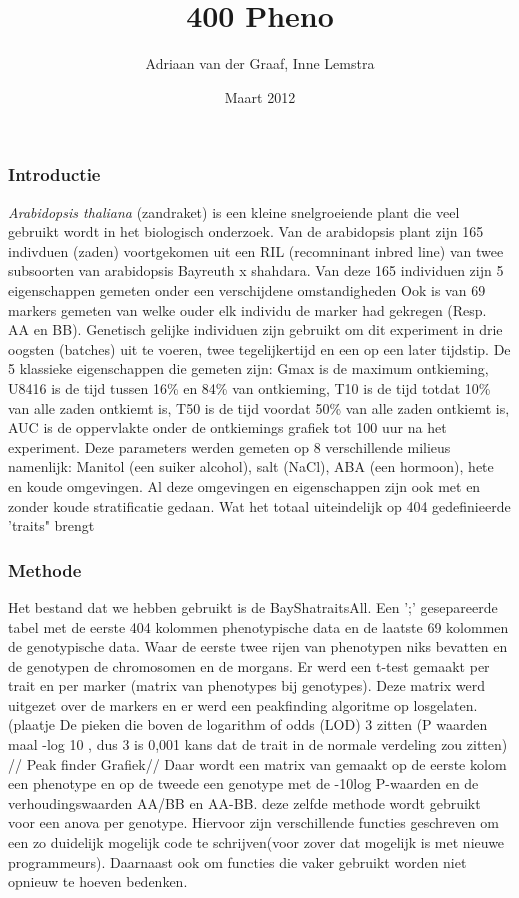 \documentclass[12pt,a4paper, twocolumn]{article}
\author{Adriaan van der Graaf, Inne Lemstra}
\title{400 Pheno}
\date{Maart 2012}
\begin{document}
\maketitle

\subsubsection*{Introductie}
\textit{Arabidopsis thaliana} (zandraket) is een kleine snelgroeiende plant die veel gebruikt wordt in het biologisch onderzoek.
Van de arabidopsis plant zijn 165 indivduen (zaden) voortgekomen uit een RIL (recomninant inbred line) van twee subsoorten van arabidopsis Bayreuth x shahdara.
Van deze 165 individuen zijn 5 eigenschappen gemeten onder een verschijdene omstandigheden
Ook is van 69 markers  gemeten van welke ouder elk individu de marker had gekregen (Resp. AA en BB).
Genetisch gelijke individuen zijn gebruikt om dit experiment in drie oogsten (batches) uit te voeren, twee tegelijkertijd en een op een later tijdstip.
De 5 klassieke eigenschappen die gemeten zijn:
Gmax is de maximum ontkieming,
U8416 is de tijd tussen 16\% en 84\% van  ontkieming,
T10 is de tijd totdat 10\% van alle zaden ontkiemt is,
T50 is de tijd voordat 50\% van alle zaden ontkiemt is,
AUC is de oppervlakte onder de ontkiemings grafiek  tot 100 uur na het experiment.
Deze parameters werden gemeten op 8 verschillende milieus namenlijk:
Manitol (een suiker alcohol), salt (NaCl), ABA (een hormoon), hete en koude omgevingen.
Al deze omgevingen en eigenschappen zijn ook met en zonder koude stratificatie gedaan. 
Wat het totaal uiteindelijk op 404 gedefinieerde 'traits" brengt\\
\subsubsection*{Methode}
Het bestand dat we hebben gebruikt is de BayShatraitsAll. 
Een ';' gesepareerde tabel met de eerste 404 kolommen phenotypische data en de laatste 69 kolommen de genotypische data.
Waar de eerste twee rijen van phenotypen niks bevatten en de genotypen de chromosomen en de morgans.
Er werd een t-test gemaakt per trait en per marker (matrix van phenotypes bij genotypes).
Deze matrix werd uitgezet over de markers en er werd een peakfinding algoritme op losgelaten. (plaatje
De pieken die boven de logarithm of odds (LOD) 3 zitten (P waarden maal -log 10 , dus 3 is 0,001 kans dat de trait in de normale verdeling zou zitten) //
Peak finder Grafiek//
Daar wordt een matrix van gemaakt op de eerste kolom een phenotype en op de tweede een genotype met de -10log P-waarden en de  verhoudingswaarden AA/BB en AA-BB.
deze zelfde methode wordt gebruikt voor een anova per genotype. 
Hiervoor zijn verschillende functies geschreven om een zo duidelijk mogelijk code te schrijven(voor zover dat mogelijk is met nieuwe programmeurs).
Daarnaast ook om functies die vaker gebruikt worden niet opnieuw te hoeven bedenken.
\end{document}
